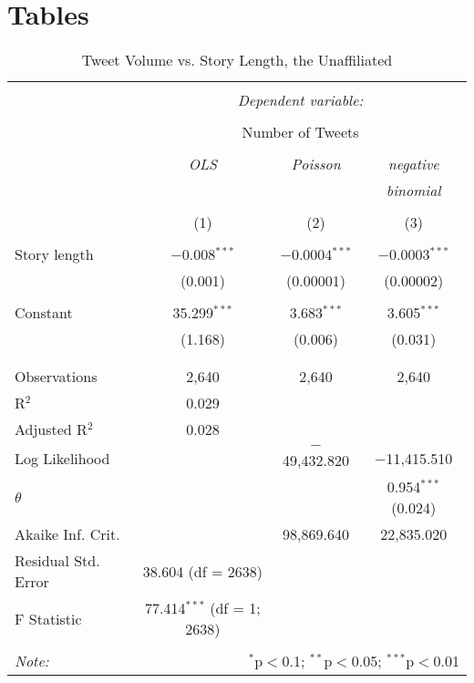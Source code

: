 \chapter{Tables}
\begin{table}[!htbp] \centering 
  \caption{Tweet Volume vs. Story Length, the Unaffiliated} 
  \label{} 
    \begin{tabular}{@{\extracolsep{5pt}}lccc} 
    \\[-1.8ex]\hline 
    \hline \\[-1.8ex] 
     & \multicolumn{3}{c}{\textit{Dependent variable:}} \\ 
    \cline{2-4} 
    \\[-1.8ex] & \multicolumn{3}{c}{Number of Tweets} \\ 
    \\[-1.8ex] & \textit{OLS} & \textit{Poisson} & \textit{negative} \\ 
     & \textit{} & \textit{} & \textit{binomial} \\ 
    \\[-1.8ex] & (1) & (2) & (3)\\ 
    \hline \\[-1.8ex] 
     Story length & $-$0.008$^{***}$ & $-$0.0004$^{***}$ & $-$0.0003$^{***}$ \\ 
      & (0.001) & (0.00001) & (0.00002) \\ 
      & & & \\ 
     Constant & 35.299$^{***}$ & 3.683$^{***}$ & 3.605$^{***}$ \\ 
      & (1.168) & (0.006) & (0.031) \\ 
      & & & \\ 
    \hline \\[-1.8ex] 
    Observations & 2,640 & 2,640 & 2,640 \\ 
    R$^{2}$ & 0.029 &  &  \\ 
    Adjusted R$^{2}$ & 0.028 &  &  \\ 
    Log Likelihood &  & $-$49,432.820 & $-$11,415.510 \\ 
    $\theta$ &  &  & 0.954$^{***}$  (0.024) \\ 
    Akaike Inf. Crit. &  & 98,869.640 & 22,835.020 \\ 
    Residual Std. Error & 38.604 (df = 2638) &  &  \\ 
    F Statistic & 77.414$^{***}$ (df = 1; 2638) &  &  \\ 
    \hline 
    \hline \\[-1.8ex] 
    \textit{Note:}  & \multicolumn{3}{r}{$^{*}$p$<$0.1; $^{**}$p$<$0.05; $^{***}$p$<$0.01} \\ 
    \end{tabular} 
\end{table} 
 

